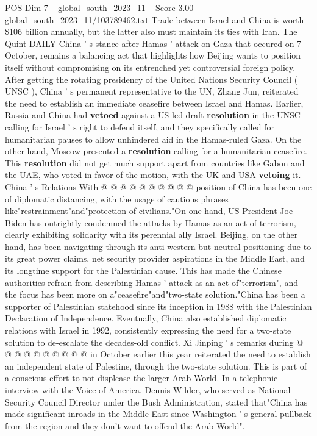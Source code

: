 \begin{textsample}{POS Dim 7 – global\_south\_2023\_11 – Score 3.00 – global\_south\_2023\_11/103789462.txt}  \label{ex:f7_pos_126}
Trade between Israel and China is worth \$106 billion annually, but the latter also must maintain its ties with Iran.
The Quint DAILY China ' s stance after Hamas ' attack on Gaza that occured on 7 October, remains a balancing act that highlights how Beijing wants to position itself without compromising on its entrenched yet controversial foreign policy.
After getting the rotating presidency of the United Nations Security Council ( UNSC ), China ' s permanent representative to the UN, Zhang Jun, reiterated the need to establish an immediate ceasefire between Israel and Hamas.
Earlier, Russia and China had \textbf{vetoed} against a US-led draft \textbf{resolution} in the UNSC calling for Israel ' s right to defend itself, and they specifically called for humanitarian pauses to allow unhindered aid in the Hamas-ruled Gaza.
On the other hand, Moscow presented a \textbf{resolution} calling for a humanitarian ceasefire.
This \textbf{resolution} did not get much support apart from countries like Gabon and the UAE, who voted in favor of the motion, with the UK and USA \textbf{vetoing} it.
China ' s Relations With @ @ @ @ @ @ @ @ @ @ position of China has been one of diplomatic distancing, with the usage of cautious phrases like"restrainment"and"protection of civilians."On one hand, US President Joe Biden has outrightly condemned the attacks by Hamas as an act of terrorism, clearly exhibiting solidarity with its perennial ally Israel.
Beijing, on the other hand, has been navigating through its anti-western but neutral positioning due to its great power claims, net security provider aspirations in the Middle East, and its longtime support for the Palestinian cause.
This has made the Chinese authorities refrain from describing Hamas ' attack as an act of"terrorism", and the focus has been more on a"ceasefire"and"two-state solution."China has been a supporter of Palestinian statehood since its inception in 1988 with the Palestinian Declaration of Independence.
Eventually, China also established diplomatic relations with Israel in 1992, consistently expressing the need for a two-state solution to de-escalate the decades-old conflict.
Xi Jinping ' s remarks during @ @ @ @ @ @ @ @ @ @ in October earlier this year reiterated the need to establish an independent state of Palestine, through the two-state solution.
This is part of a conscious effort to not displease the larger Arab World.
In a telephonic interview with the Voice of America, Dennis Wilder, who served as National Security Council Director under the Bush Administration, stated that"China has made significant inroads in the Middle East since Washington ' s general pullback from the region and they don't want to offend the Arab World".

\end{textsample}
